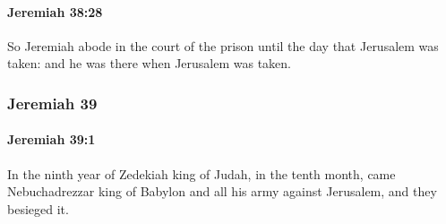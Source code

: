 		\paragraph{Jeremiah 38:28} %
			\label{JEREMIAH-38-28}

			So Jeremiah abode in the court of the prison until the day that Jerusalem was taken: and he was there when Jerusalem was taken.

	\subsubsection{Jeremiah 39} %
		\label{JEREMIAH-39}

		\paragraph{Jeremiah 39:1} %
			\label{JEREMIAH-39-1}

			In the ninth year of Zedekiah king of Judah, in the tenth month, came Nebuchadrezzar king of Babylon and all his army against Jerusalem, and they besieged it.

